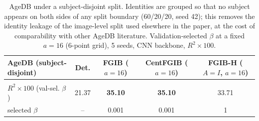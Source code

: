 \begin{table}[t]
\caption{AgeDB under a subject-disjoint split. Identities are grouped so that no subject appears on both sides of any split boundary (60/20/20, seed 42); this removes the identity leakage of the image-level split used elsewhere in the paper, at the cost of comparability with other AgeDB literature. Validation-selected $\beta$ at a fixed $a=16$ (6-point grid), 5 seeds, CNN backbone, $R^2\times100$.}
\label{tab:agedb-disjoint}
\begin{center}\small
\begin{tabular}{lcccc}
AgeDB (subject-disjoint) & Det. & FGIB ($a{=}16$) & CentFGIB ($a{=}16$) & FGIB-H ($A{=}I$, $a{=}16$) \\ \hline \\[-1.8ex]
$R^2\times100$ (val-sel. $\beta$) & 21.37 & \textbf{35.10} & \textbf{35.10} & 33.71 \\
selected $\beta$ & -- & 0.001 & 0.001 & 1 \\
\end{tabular}\end{center}\end{table}
